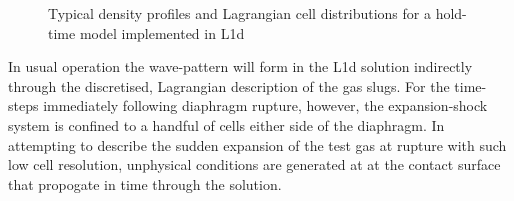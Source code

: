 \documentclass[a4paper,10pt]{article}
\begin{document}
\begin{figure}
\centering
{} \hspace{1cm}
 \caption{Typical density profiles and Lagrangian cell distributions for a hold-time model implemented in L1d}
\label{fig:ref_profile} %
\end{figure}

\par \medskip

In usual operation the wave-pattern will form in the L1d solution indirectly through the discretised, Lagrangian description of the gas slugs.  For the time-steps immediately following diaphragm rupture, however, the expansion-shock system is confined to a handful of cells either side of the diaphragm.  In attempting to describe the sudden expansion of the test gas at rupture with such low cell resolution, unphysical conditions are generated at at the contact surface that propogate in time through the solution.
\end{document}
